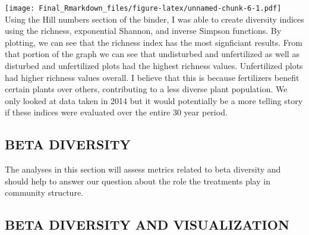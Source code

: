 \documentclass[
]{article}
\begin{document}
\texttt{[image: Final\_Rmarkdown\_files/figure-latex/unnamed-chunk-6-1.pdf]}
Using the Hill numbers section of the binder, I was able to create
diversity indices using the richness, exponential Shannon, and inverse
Simpson functions. By plotting, we can see that the richness index has
the most signficiant results. From that portion of the graph we can see
that undisturbed and unfertilized as well as disturbed and unfertilized
plots had the highest richness values. Unfertilized plots had higher
richness values overall. I believe that this is because fertilizers
benefit certain plants over others, contributing to a less diverse plant
population. We only looked at data taken in 2014 but it would
potentially be a more telling story if these indices were evaluated over
the entire 30 year period.

\hypertarget{beta-diversity}{%
\subsection{BETA DIVERSITY}\label{beta-diversity}}

The analyses in this section will assess metrics related to beta
diversity and should help to answer our question about the role the
treatments play in community structure.

\hypertarget{beta-diversity-and-visualization}{%
\subsection{BETA DIVERSITY AND
VISUALIZATION}\label{beta-diversity-and-visualization}}
\end{document}
